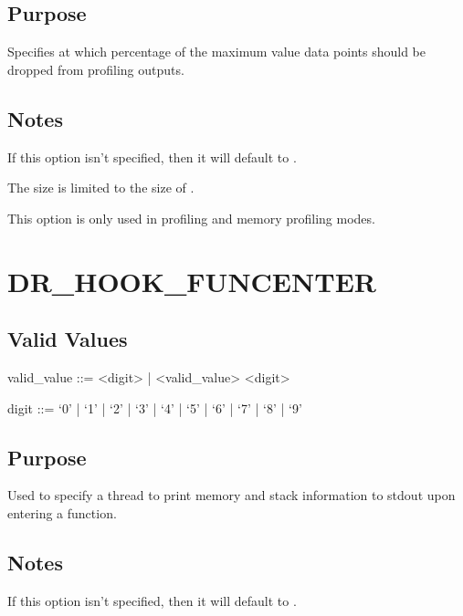 \documentclass[letterpaper,10pt,english]{sphinxmanual}
\begin{document}
\subsection{Purpose}
\label{\detokenize{flag/flag:id77}}
\sphinxAtStartPar
Specifies at which percentage of the maximum value data points should be dropped from profiling outputs.


\subsection{Notes}
\label{\detokenize{flag/flag:id78}}
\sphinxAtStartPar
If this option isn’t specified, then it will default to .

\sphinxAtStartPar
The size is limited to the size of .

\sphinxAtStartPar
This option is only used in profiling and memory profiling modes.


\section{DR\_HOOK\_FUNCENTER}
\label{\detokenize{flag/flag:dr-hook-funcenter}}\label{\detokenize{flag/flag:id80}}

\subsection{Valid Values}
\label{\detokenize{flag/flag:id81}}
\begin{DUlineblock}{0em}
\item[] valid\_value ::= \textless{}digit\textgreater{} | \textless{}valid\_value\textgreater{} \textless{}digit\textgreater{}
\item[] digit ::= ‘0’ | ‘1’ | ‘2’ | ‘3’ | ‘4’ | ‘5’ | ‘6’ | ‘7’ | ‘8’ | ‘9’
\end{DUlineblock}


\subsection{Purpose}
\label{\detokenize{flag/flag:id82}}
\sphinxAtStartPar
Used to specify a thread to print memory and stack information to stdout upon entering a function.


\subsection{Notes}
\label{\detokenize{flag/flag:id83}}
\sphinxAtStartPar
If this option isn’t specified, then it will default to .
\end{document}
